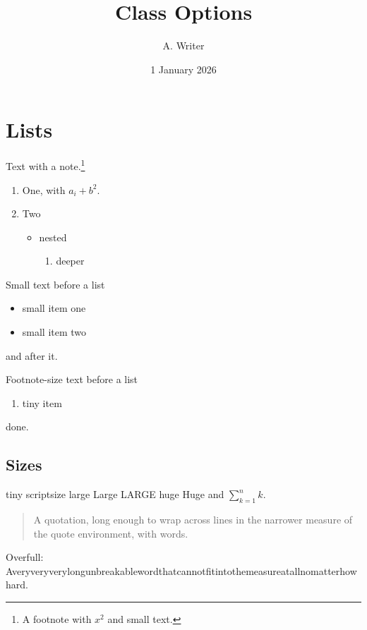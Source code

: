 \documentclass[draft]{article}
\begin{document}
\title{Class Options}\author{A. Writer}\date{1 January 2026}\maketitle
\section{Lists}
Text with a note.\footnote{A footnote with $x^2$ and \small small text.}
\begin{enumerate}
\item One, with $a_i + b^2$.
\item Two
  \begin{itemize}
  \item nested
    \begin{enumerate}
    \item deeper
    \end{enumerate}
  \end{itemize}
\end{enumerate}
{\small Small text before a list
\begin{itemize}
\item small item one
\item small item two
\end{itemize}
and after it.}
{\footnotesize Footnote-size text before a list
\begin{enumerate}
\item tiny item
\end{enumerate}
done.}
\subsection{Sizes}
{\tiny tiny} {\scriptsize scriptsize} {\large large} {\Large Large} {\LARGE LARGE} {\huge huge} {\Huge Huge} and $\sum_{k=1}^n k$.
\begin{quote}
A quotation, long enough to wrap across lines in the narrower measure of the quote environment, with words.
\end{quote}
Overfull: \mbox{Averyveryverylongunbreakablewordthatcannotfitintothemeasureatallnomatterhowhard}.
\end{document}
